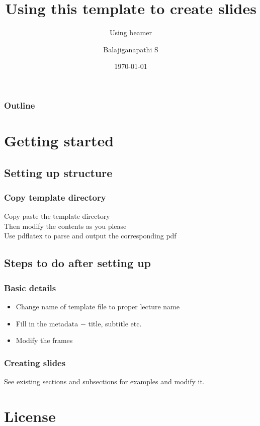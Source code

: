 \documentclass{beamer}
\title[Use template]{Using this template to create slides}
\subtitle[Using beamer]{Using beamer}
\author{Balajiganapathi S}
\institute{code-drills.com}
\date{\today} %
\begin{document}
\frame{\titlepage{}}

\begin{frame}
    \frametitle{Outline}
    \tableofcontents[hideallsubsections]
\end{frame}

\section{Getting started}
\subsection{Setting up structure}

\begin{frame}
    \frametitle{Copy template directory}
    Copy paste the template directory \pause{} \\
    Then modify the contents as you please \pause{} \\
    Use pdflatex to parse and output the corresponding pdf \\
\end{frame}

\subsection{Steps to do after setting up}
\begin{frame}
    \frametitle{Basic details}
    \begin{itemize}
        \item Change name of template file to proper lecture name
        \item Fill in the metadata $-$ title, subtitle etc.
        \item Modify the frames
    \end{itemize}
\end{frame}

\begin{frame}
    \frametitle{Creating slides}
    See existing sections and subsections for examples and modify it.
\end{frame}

\section{License}
\end{document}
